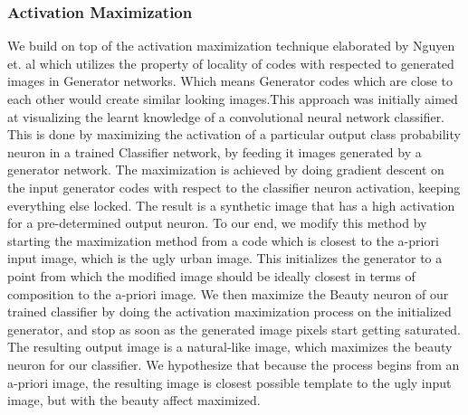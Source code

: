 \subsubsection{Activation Maximization}
We build on top of the activation maximization technique elaborated by Nguyen et. al \cite{nguyen2016synthesizing} which utilizes the property of locality of codes with respected to generated images in Generator networks. Which means Generator codes which are close to each other would create similar looking images.This approach was initially aimed at visualizing the learnt knowledge of a convolutional neural network classifier. This is done by maximizing the activation of a particular output class probability neuron in a trained Classifier network, by feeding it images generated by a generator network. The maximization is achieved by doing gradient descent on the input generator codes with respect to the classifier neuron activation, keeping everything else locked. The result is a synthetic image that has a high activation for a pre-determined output neuron.
To our end, we modify this method by starting the maximization method from a code which is closest to the a-priori input image, which is the ugly urban image. This initializes the generator to a point from which the modified image should be ideally closest in terms of composition to the a-priori image. We then maximize the Beauty neuron of our trained classifier by doing the activation maximization process on the initialized generator, and stop as soon as the generated image pixels start getting saturated. The resulting output image is a natural-like image, which maximizes the beauty neuron for our classifier. We hypothesize that because the process begins from an a-priori image, the resulting image is closest possible template to the ugly input image, but with the beauty affect maximized. 



